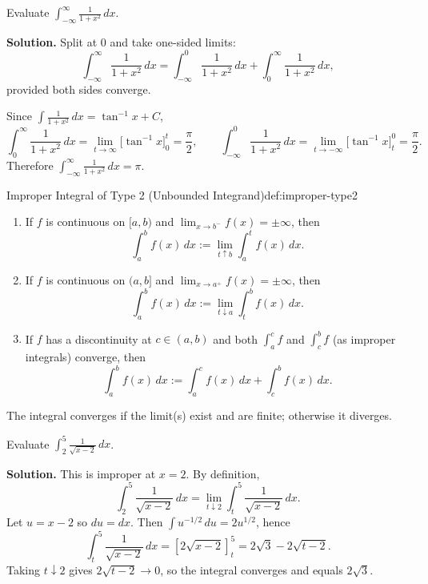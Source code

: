\begin{examplebox}[title={Worked Example: Type 1 evaluation (split correctly)}]
Evaluate $\displaystyle \int_{-\infty}^{\infty}\frac{1}{1+x^2}\,dx$.

\textbf{Solution.}
Split at $0$ and take one-sided limits:
\[
\int_{-\infty}^{\infty}\frac{1}{1+x^2}\,dx
=\int_{-\infty}^{0}\frac{1}{1+x^2}\,dx+\int_{0}^{\infty}\frac{1}{1+x^2}\,dx,
\]
provided both sides converge.

Since $\int \frac{1}{1+x^2}\,dx=\tan^{-1}x+C$,
\[
\int_{0}^{\infty}\frac{1}{1+x^2}\,dx=\lim_{t\to\infty}\bigl[\tan^{-1}x\bigr]_0^t
=\frac{\pi}{2},
\qquad
\int_{-\infty}^{0}\frac{1}{1+x^2}\,dx=\lim_{t\to-\infty}\bigl[\tan^{-1}x\bigr]_t^0
=\frac{\pi}{2}.
\]
Therefore $\displaystyle \int_{-\infty}^{\infty}\frac{1}{1+x^2}\,dx=\pi$.
\end{examplebox}

\begin{definition}{Improper Integral of Type 2 (Unbounded Integrand)}{def:improper-type2}
\begin{enumerate}[label=(\alph*), leftmargin=*]
\item If $f$ is continuous on $[a,b)$ and $\lim_{x\to b^-}f(x)=\pm\infty$, then
\[
\int_a^b f(x)\,dx := \lim_{t\uparrow b}\int_a^t f(x)\,dx.
\]
\item If $f$ is continuous on $(a,b]$ and $\lim_{x\to a^+}f(x)=\pm\infty$, then
\[
\int_a^b f(x)\,dx := \lim_{t\downarrow a}\int_t^b f(x)\,dx.
\]
\item If $f$ has a discontinuity at $c\in(a,b)$ and both $\int_a^c f$ and $\int_c^b f$ (as improper integrals) converge, then
\[
\int_a^b f(x)\,dx := \int_a^c f(x)\,dx + \int_c^b f(x)\,dx.
\]
\end{enumerate}
The integral converges if the limit(s) exist and are finite; otherwise it diverges.
\end{definition}

\begin{examplebox}[title={Worked Example: Type 2 at an endpoint}]
Evaluate $\displaystyle \int_{2}^{5}\frac{1}{\sqrt{x-2}}\,dx$.

\textbf{Solution.}
This is improper at $x=2$. By definition,
\[
\int_{2}^{5}\frac{1}{\sqrt{x-2}}\,dx=\lim_{t\downarrow 2}\int_{t}^{5}\frac{1}{\sqrt{x-2}}\,dx.
\]
Let $u=x-2$ so $du=dx$. Then $\int u^{-1/2}\,du = 2u^{1/2}$, hence
\[
\int_{t}^{5}\frac{1}{\sqrt{x-2}}\,dx
= \left[2\sqrt{x-2}\right]_{t}^{5}
=2\sqrt{3}-2\sqrt{t-2}.
\]
Taking $t\downarrow 2$ gives $2\sqrt{t-2}\to 0$, so the integral converges and equals $2\sqrt{3}$.
\end{examplebox}

